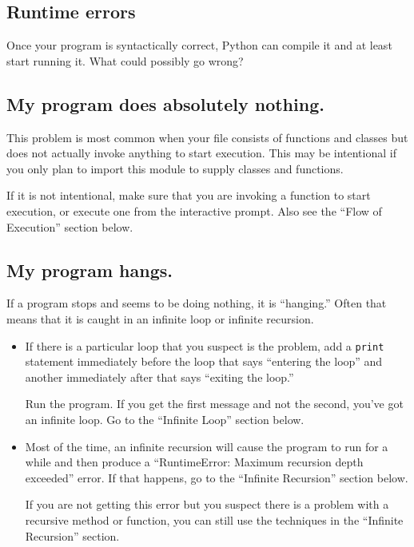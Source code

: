\documentclass[10pt]{book}
\begin{document}
\begin{CJK}{UTF8}{gbsn}
\section{Runtime errors}

Once your program is syntactically correct,
Python can compile it and at least start running it.  What could
possibly go wrong?


\subsection{My program does absolutely nothing.}

This problem is most common when your file consists of functions and
classes but does not actually invoke anything to start execution.
This may be intentional if you only plan to import this module to
supply classes and functions.

If it is not intentional, make sure that you
are invoking a function to start execution, or execute one from
the interactive prompt.  Also see the ``Flow of Execution'' section
below.


\subsection{My program hangs.}

If a program stops and seems to be doing nothing, it is ``hanging.''
Often that means that it is caught in an infinite loop or infinite
recursion.

\begin{itemize}

\item If there is a particular loop that you suspect is the
problem, add a {\tt print} statement immediately before the loop that says
``entering the loop'' and another immediately after that says
``exiting the loop.''

Run the program.  If you get the first message and not the second,
you've got an infinite loop.  Go to the ``Infinite Loop'' section
below.

\item Most of the time, an infinite recursion will cause the program
to run for a while and then produce a ``RuntimeError: Maximum
recursion depth exceeded'' error.  If that happens, go to the
``Infinite Recursion'' section below.

If you are not getting this error but you suspect there is a problem
with a recursive method or function, you can still use the techniques
in the ``Infinite Recursion'' section.


\end{itemize}
\end{CJK}
\end{document}
